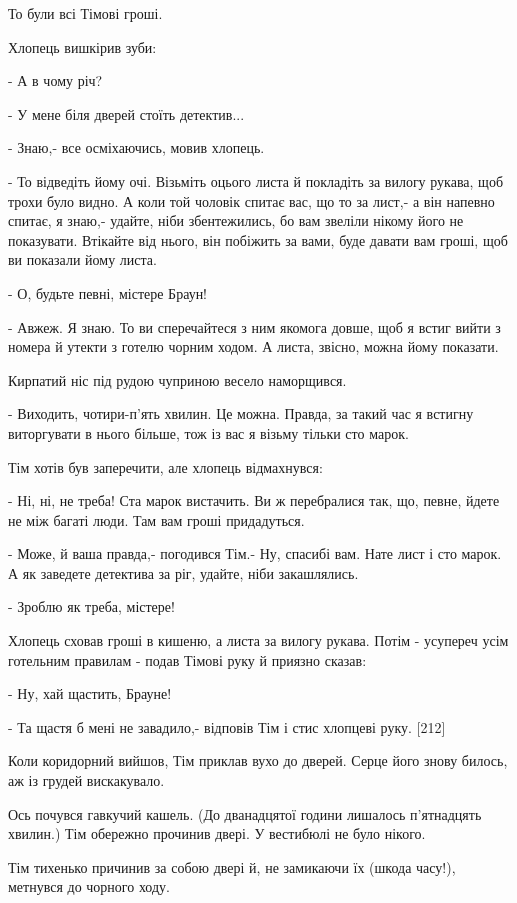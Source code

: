 То були всі Тімові гроші.

Хлопець вишкірив зуби:

- А в чому річ?

- У мене біля дверей стоїть детектив...

- Знаю,- все осміхаючись, мовив хлопець.

- То відведіть йому очі. Візьміть оцього листа й покладіть за вилогу рукава, щоб трохи було видно. А коли той чоловік спитає вас, що то за лист,- а він напевно спитає, я знаю,- удайте, ніби збентежились, бо вам звеліли нікому його не показувати. Втікайте від нього, він побіжить за вами, буде давати вам гроші, щоб ви показали йому листа.

- О, будьте певні, містере Браун!

- Авжеж. Я знаю. То ви сперечайтеся з ним якомога довше, щоб я встиг вийти з номера й утекти з готелю чорним ходом. А листа, звісно, можна йому показати.

Кирпатий ніс під рудою чуприною весело наморщився.

- Виходить, чотири-п'ять хвилин. Це можна. Правда, за такий час я встигну виторгувати в нього більше, тож із вас я візьму тільки сто марок.

Тім хотів був заперечити, але хлопець відмахнувся:

- Ні, ні, не треба! Ста марок вистачить. Ви ж перебралися так, що, певне, йдете не між багаті люди. Там вам гроші придадуться.

- Може, й ваша правда,- погодився Тім.- Ну, спасибі вам. Нате лист і сто марок. А як заведете детектива за ріг, удайте, ніби закашлялись.

- Зроблю як треба, містере!

Хлопець сховав гроші в кишеню, а листа за вилогу рукава. Потім - усупереч усім готельним правилам - подав Тімові руку й приязно сказав:

- Ну, хай щастить, Брауне!

- Та щастя б мені не завадило,- відповів Тім і стис хлопцеві руку. [212]

Коли коридорний вийшов, Тім приклав вухо до дверей. Серце його знову билось, аж із грудей вискакувало.

Ось почувся гавкучий кашель. (До дванадцятої години лишалось п'ятнадцять хвилин.) Тім обережно прочинив двері. У вестибюлі не було нікого.

Тім тихенько причинив за собою двері й, не замикаючи їх (шкода часу!), метнувся до чорного ходу.

